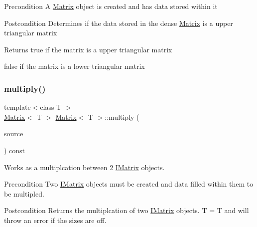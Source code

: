\begin{DoxyPrecond}{Precondition}
A \mbox{\hyperlink{class_matrix}{Matrix}} object is created and has data stored within it 
\end{DoxyPrecond}
\begin{DoxyPostcond}{Postcondition}
Determines if the data stored in the dense \mbox{\hyperlink{class_matrix}{Matrix}} is a upper triangular matrix
\end{DoxyPostcond}
\begin{DoxyReturn}{Returns}
true if the matrix is a upper triangular matrix 

false if the matrix is a lower triangular matrix 
\end{DoxyReturn}
\mbox{\label{class_matrix_a48fc463a410f5d2b0381830d78229c2c}} 
\subsubsection{\texorpdfstring{multiply()}{multiply()}\hspace{0.1cm}{\footnotesize\ttfamily [1/6]}}
{\footnotesize\ttfamily template$<$class T $>$ \\
\mbox{\hyperlink{class_matrix}{Matrix}}$<$ T $>$ \mbox{\hyperlink{class_matrix}{Matrix}}$<$ T $>$\+::multiply (\begin{DoxyParamCaption}\item[{const \mbox{\hyperlink{class_i_matrix}{I\+Matrix}}$<$ \mbox{\hyperlink{class_matrix}{Matrix}}$<$ T $>$, T $>$ \&}]{source }\end{DoxyParamCaption}) const\hspace{0.3cm}{\ttfamily [virtual]}}



Works as a multiplcation between 2 \mbox{\hyperlink{class_i_matrix}{I\+Matrix}} objects. 

\begin{DoxyPrecond}{Precondition}
Two \mbox{\hyperlink{class_i_matrix}{I\+Matrix}} objects must be created and data filled within them to be multipled. 
\end{DoxyPrecond}
\begin{DoxyPostcond}{Postcondition}
Returns the multiplcation of two \mbox{\hyperlink{class_i_matrix}{I\+Matrix}} objects. T = T and will throw an error if the sizes are off.
\end{DoxyPostcond}

